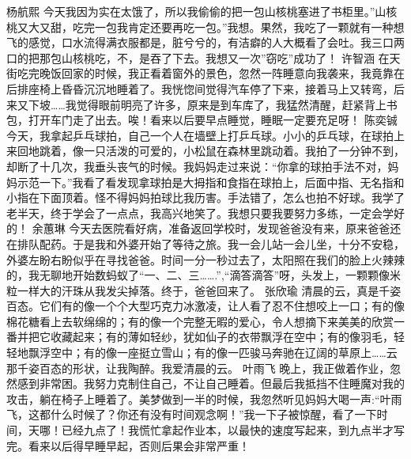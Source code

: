 {}杨航熙\markdownRendererInterblockSeparator
{}今天我因为实在太饿了，所以我偷偷的把一包山核桃塞进了书柜里。”山核桃又大又甜，吃完一包我肯定还要再吃一包。”我想。果然，我吃了一颗就有一种想飞的感觉，口水流得满衣服都是，脏兮兮的，有洁癖的人大概看了会吐。我三口两口的把那包山核桃吃，不，是吞了下去。我想又一次”窃吃”成功了！\markdownRendererInterblockSeparator
{}\markdownRendererInterblockSeparator
{}许智涵\markdownRendererInterblockSeparator
{}在天街吃完晚饭回家的时候，我正看着窗外的景色，忽然一阵睡意向我袭来，我竟靠在后排座椅上昏昏沉沉地睡着了。我恍惚间觉得汽车停了下来，接着马上又转弯，后来又下坡……我觉得眼前明亮了许多，原来是到车库了，我猛然清醒，赶紧背上书包，打开车门走了出去。唉！看来以后要早点睡觉，睡眠一定要充足呀！\markdownRendererInterblockSeparator
{}\markdownRendererInterblockSeparator
{}陈奕铖\markdownRendererInterblockSeparator
{}今天，我拿起乒乓球拍，自己一个人在墙壁上打乒乓球。小小的乒乓球，在球拍上来回地跳着，像一只活泼的可爱的，小松鼠在森林里跳动着。我拍了一分钟不到，却断了十几次，我垂头丧气的时候。我妈妈走过来说：“你拿的球拍手法不对，妈妈示范一下。”我看了看发现拿球拍是大拇指和食指在球拍上，后面中指、无名指和小指在下面顶着。怪不得妈妈拍球比我历害。手法错了，怎么也拍不好球。我学了老半天，终于学会了一点点，我高兴地笑了。我想只要我要努力多练，一定会学好的！\markdownRendererInterblockSeparator
{}\markdownRendererInterblockSeparator
{}余蕙琳\markdownRendererInterblockSeparator
{}今天去医院看好病，准备返回学校时，发现爸爸没有来，原来爸爸还在排队配药。于是我和外婆开始了等待之旅。我一会儿站一会儿坐，十分不安稳，外婆左盼右盼似乎在寻找爸爸。时间一分一秒过去了，太阳照在我们的脸上火辣辣的，我无聊地开始数蚂蚁了“一、二、三…….”,“滴答滴答”呀，头发上，一颗颗像米粒一样大的汗珠从我发尖掉落。终于，爸爸回来了。\markdownRendererInterblockSeparator
{}\markdownRendererInterblockSeparator
{}张欣瑜\markdownRendererInterblockSeparator
{}清晨的云，真是千姿百态。它们有的像一个个大型巧克力冰激凌，让人看了忍不住想咬上一口；有的像棉花糖看上去软绵绵的；有的像一个完整无暇的爱心，令人想摘下来美美的欣赏一番并把它收藏起来；有的薄如轻纱，犹如仙子的衣带飘浮在空中；有的像羽毛，轻轻地飘浮空中；有的像一座挺立雪山；有的像一匹骏马奔驰在辽阔的草原上……云那千姿百态的形状，让我陶醉。我爱清晨的云。\markdownRendererInterblockSeparator
{}\markdownRendererInterblockSeparator
{}叶雨飞\markdownRendererInterblockSeparator
{}晚上，我正做着作业，忽然感到非常困。我努力克制住自己，不让自己睡着。但最后我抵挡不住睡魔对我的攻击，躺在椅子上睡着了。美梦做到一半的时候，我忽然听见妈妈大喝一声:“叶雨飞，这都什么时候了？你还有没有时间观念啊！”我一下子被惊醒，看了一下时间，天哪！已经九点了！我慌忙拿起作业本，以最快的速度写起来，到九点半才写完。看来以后得早睡早起，否则后果会非常严重！\markdownRendererInterblockSeparator
